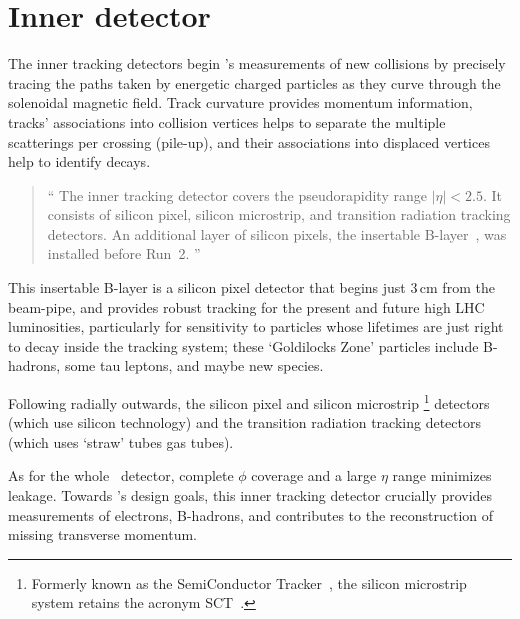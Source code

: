

\section{Inner detector}
\label{sec:atlas_inner}
The inner tracking detectors begin \atlas's measurements of new collisions
by precisely tracing the paths taken by energetic charged particles
as they curve through the solenoidal magnetic field.
Track curvature provides momentum information,
tracks' associations into collision vertices helps to separate the multiple
scatterings per crossing (pile-up),
and their associations into displaced vertices help to identify
decays.
\begin{quote}
``%
The inner tracking detector covers the pseudorapidity range $|\eta| < 2.5$.
It consists of silicon pixel, silicon microstrip, and transition radiation
tracking detectors.
An additional layer of silicon pixels, the insertable
B-layer~\cite{ATLAS-TDR-19, PIX-2018-001}, was installed before Run~2.%
''~\cite{atlas2022searches}
\end{quote}
This insertable B-layer is a silicon pixel detector that begins just
$3\,\textrm{cm}$ from the beam-pipe, and provides robust tracking for the
present and future high LHC luminosities,
particularly for sensitivity to particles whose lifetimes are just right to
decay inside the tracking system;
these `Goldilocks Zone' particles include B-hadrons, some tau leptons, and
maybe new species.

Following radially outwards, the silicon pixel and silicon microstrip%
\footnote{%
Formerly known as the SemiConductor Tracker~\cite{atlas1999design1},
the silicon microstrip system retains the acronym
SCT~\cite{atlas2008experiment}.%
}
detectors (which use silicon technology)
and the transition radiation tracking detectors (which uses `straw' tubes
gas tubes).

As for the whole \atlas\ detector, complete $\phi$ coverage and a large $\eta$
range minimizes leakage.
Towards \atlas's design goals, this inner tracking detector crucially provides
measurements of electrons, B-hadrons, and contributes to the reconstruction of
missing transverse momentum.


